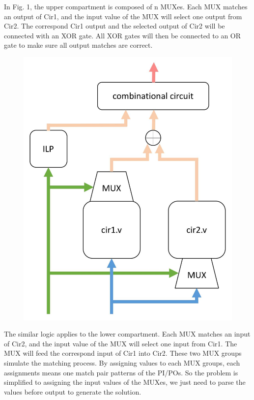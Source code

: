 In Fig. 1, the upper compartment is composed of n MUXes. Each MUX matches an output of Cir1, and the input value of the MUX will select one output from Cir2. The correspond Cir1 output and the selected output of Cir2 will be connected with an XOR gate. All XOR gates will then be connected to an OR gate to make sure all output matches are correct.

    \begin{figure}[H]
    \centering
    \includegraphics[scale=0.32]{images/structure}
    \caption{}
    \end{figure}

The similar logic applies to the lower compartment. Each MUX matches an input of Cir2, and the input value of the MUX will select one input from Cir1. The MUX will feed the correspond input of Cir1 into Cir2.
These two MUX groups simulate the matching process. By assigning values to each MUX groups, each assignments means one match pair patterns of the PI/POs. So the problem is simplified to assigning the input values of the MUXes, we just need to parse the values before output to generate the solution.
